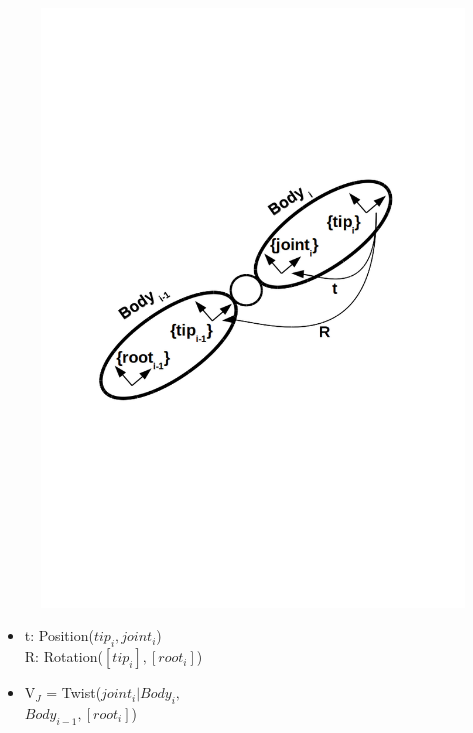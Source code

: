 \documentclass{beamer}
\begin{document}
\begin{frame}
\begin{figure}
\begin{minipage}{.4\textwidth}
  \includegraphics[trim=0 350 0 200,width=1.1\linewidth]{images/featherstone_rigidbodyi}
\end{minipage}
\end{figure}	
\vspace{-1.6cm}
\begin{minipage}{.45\textwidth}
  \centering
	\begin{itemize}
	\item t: Position($tip_i, joint_i$) \\ R: Rotation($[tip_i], [root_i]$)
	\item V$_J$ = Twist($joint_i | Body_i,$ \\$Body_{i-1}, [root_i]$)
	\end{itemize}
\end{minipage}
\begin{minipage}{.45\textwidth}
  \centering
	\begin{itemize}

\end{itemize}
\end{minipage}
\end{frame}
\end{document}
